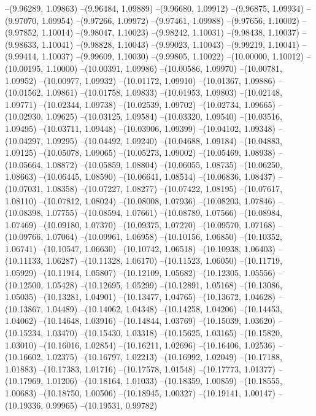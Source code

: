 --(9.96289, 1.09863)
--(9.96484, 1.09889)
--(9.96680, 1.09912)
--(9.96875, 1.09934)
--(9.97070, 1.09954)
--(9.97266, 1.09972)
--(9.97461, 1.09988)
--(9.97656, 1.10002)
--(9.97852, 1.10014)
--(9.98047, 1.10023)
--(9.98242, 1.10031)
--(9.98438, 1.10037)
--(9.98633, 1.10041)
--(9.98828, 1.10043)
--(9.99023, 1.10043)
--(9.99219, 1.10041)
--(9.99414, 1.10037)
--(9.99609, 1.10030)
--(9.99805, 1.10022)
--(10.00000, 1.10012)
--(10.00195, 1.10000)
--(10.00391, 1.09986)
--(10.00586, 1.09970)
--(10.00781, 1.09952)
--(10.00977, 1.09932)
--(10.01172, 1.09910)
--(10.01367, 1.09886)
--(10.01562, 1.09861)
--(10.01758, 1.09833)
--(10.01953, 1.09803)
--(10.02148, 1.09771)
--(10.02344, 1.09738)
--(10.02539, 1.09702)
--(10.02734, 1.09665)
--(10.02930, 1.09625)
--(10.03125, 1.09584)
--(10.03320, 1.09540)
--(10.03516, 1.09495)
--(10.03711, 1.09448)
--(10.03906, 1.09399)
--(10.04102, 1.09348)
--(10.04297, 1.09295)
--(10.04492, 1.09240)
--(10.04688, 1.09184)
--(10.04883, 1.09125)
--(10.05078, 1.09065)
--(10.05273, 1.09002)
--(10.05469, 1.08938)
--(10.05664, 1.08872)
--(10.05859, 1.08804)
--(10.06055, 1.08735)
--(10.06250, 1.08663)
--(10.06445, 1.08590)
--(10.06641, 1.08514)
--(10.06836, 1.08437)
--(10.07031, 1.08358)
--(10.07227, 1.08277)
--(10.07422, 1.08195)
--(10.07617, 1.08110)
--(10.07812, 1.08024)
--(10.08008, 1.07936)
--(10.08203, 1.07846)
--(10.08398, 1.07755)
--(10.08594, 1.07661)
--(10.08789, 1.07566)
--(10.08984, 1.07469)
--(10.09180, 1.07370)
--(10.09375, 1.07270)
--(10.09570, 1.07168)
--(10.09766, 1.07064)
--(10.09961, 1.06958)
--(10.10156, 1.06850)
--(10.10352, 1.06741)
--(10.10547, 1.06630)
--(10.10742, 1.06518)
--(10.10938, 1.06403)
--(10.11133, 1.06287)
--(10.11328, 1.06170)
--(10.11523, 1.06050)
--(10.11719, 1.05929)
--(10.11914, 1.05807)
--(10.12109, 1.05682)
--(10.12305, 1.05556)
--(10.12500, 1.05428)
--(10.12695, 1.05299)
--(10.12891, 1.05168)
--(10.13086, 1.05035)
--(10.13281, 1.04901)
--(10.13477, 1.04765)
--(10.13672, 1.04628)
--(10.13867, 1.04489)
--(10.14062, 1.04348)
--(10.14258, 1.04206)
--(10.14453, 1.04062)
--(10.14648, 1.03916)
--(10.14844, 1.03769)
--(10.15039, 1.03620)
--(10.15234, 1.03470)
--(10.15430, 1.03318)
--(10.15625, 1.03165)
--(10.15820, 1.03010)
--(10.16016, 1.02854)
--(10.16211, 1.02696)
--(10.16406, 1.02536)
--(10.16602, 1.02375)
--(10.16797, 1.02213)
--(10.16992, 1.02049)
--(10.17188, 1.01883)
--(10.17383, 1.01716)
--(10.17578, 1.01548)
--(10.17773, 1.01377)
--(10.17969, 1.01206)
--(10.18164, 1.01033)
--(10.18359, 1.00859)
--(10.18555, 1.00683)
--(10.18750, 1.00506)
--(10.18945, 1.00327)
--(10.19141, 1.00147)
--(10.19336, 0.99965)
--(10.19531, 0.99782)
